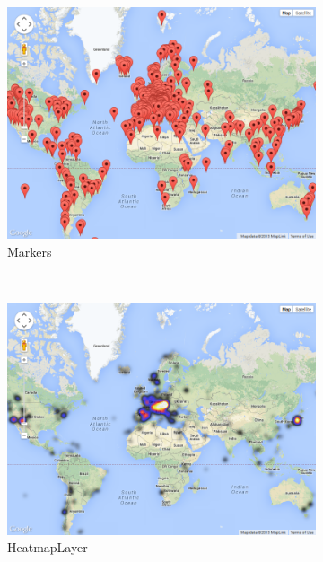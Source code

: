 \begin{figure}
    \begin{subfigure}[t]{0.32\textwidth}
        \includegraphics[width=\textwidth]{img/features/markers.png}
        \caption{Markers}
    \end{subfigure}
    ~
    \begin{subfigure}[t]{0.32\textwidth}
        \includegraphics[width=\textwidth]{img/features/heatmap.png}
        \caption{HeatmapLayer}
    \end{subfigure}
    ~
    \begin{subfigure}[t]{0.32\textwidth}

\end{subfigure}
\end{figure}
